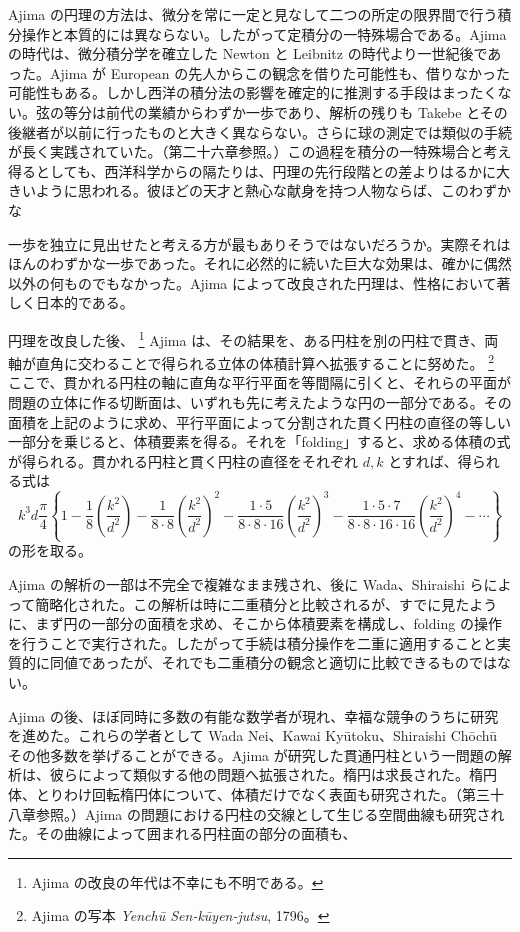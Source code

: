 \documentclass[11pt]{article}
\newcommand{\scanpage}[2]{\clearpage\setcounter{footnote}{0}\noindent{\footnotesize\color{gray}PDF #1 頁 · #2}\par\medskip}
\newcommand{\scanfooter}{}
\begin{document}
Ajima の円理の方法は、微分を常に一定と見なして二つの所定の限界間で行う積分操作と本質的には異ならない。したがって定積分の一特殊場合である。Ajima の時代は、微分積分学を確立した Newton と Leibnitz の時代より一世紀後であった。Ajima が European の先人からこの観念を借りた可能性も、借りなかった可能性もある。しかし西洋の積分法の影響を確定的に推測する手段はまったくない。弦の等分は前代の業績からわずか一歩であり、解析の残りも Takebe とその後継者が以前に行ったものと大きく異ならない。さらに球の測定では類似の手続が長く実践されていた。（第二十六章参照。）この過程を積分の一特殊場合と考え得るとしても、西洋科学からの隔たりは、円理の先行段階との差よりはるかに大きいように思われる。彼ほどの天才と熱心な献身を持つ人物ならば、このわずかな
\scanfooter

\scanpage{0186}{第22章、印刷頁172}
一歩を独立に見出せたと考える方が最もありそうではないだろうか。実際それはほんのわずかな一歩であった。それに必然的に続いた巨大な効果は、確かに偶然以外の何ものでもなかった。Ajima によって改良された円理は、性格において著しく日本的である。

円理を改良した後、
\footnote{Ajima の改良の年代は不幸にも不明である。}
Ajima は、その結果を、ある円柱を別の円柱で貫き、両軸が直角に交わることで得られる立体の体積計算へ拡張することに努めた。
\footnote{Ajima の写本 \emph{Yenchū Sen-kūyen-jutsu}, 1796。}
ここで、貫かれる円柱の軸に直角な平行平面を等間隔に引くと、それらの平面が問題の立体に作る切断面は、いずれも先に考えたような円の一部分である。その面積を上記のように求め、平行平面によって分割された貫く円柱の直径の等しい一部分を乗じると、体積要素を得る。それを「folding」すると、求める体積の式が得られる。貫かれる円柱と貫く円柱の直径をそれぞれ $d,k$ とすれば、得られる式は
\[
k^3d\frac{\pi}{4}\left\{1-\frac18\left(\frac{k^2}{d^2}\right)
-\frac1{8\cdot8}\left(\frac{k^2}{d^2}\right)^2
-\frac{1\cdot5}{8\cdot8\cdot16}\left(\frac{k^2}{d^2}\right)^3
-\frac{1\cdot5\cdot7}{8\cdot8\cdot16\cdot16}\left(\frac{k^2}{d^2}\right)^4-\cdots\right\}
\]
の形を取る。

Ajima の解析の一部は不完全で複雑なまま残され、後に Wada、Shiraishi らによって簡略化された。この解析は時に二重積分と比較されるが、すでに見たように、まず円の一部分の面積を求め、そこから体積要素を構成し、folding の操作を行うことで実行された。したがって手続は積分操作を二重に適用することと実質的に同値であったが、それでも二重積分の観念と適切に比較できるものではない。

Ajima の後、ほぼ同時に多数の有能な数学者が現れ、幸福な競争のうちに研究を進めた。これらの学者として Wada Nei、Kawai Kyūtoku、Shiraishi Chōchū その他多数を挙げることができる。Ajima が研究した貫通円柱という一問題の解析は、彼らによって類似する他の問題へ拡張された。楕円は求長された。楕円体、とりわけ回転楕円体について、体積だけでなく表面も研究された。（第三十八章参照。）Ajima の問題における円柱の交線として生じる空間曲線も研究された。その曲線によって囲まれる円柱面の部分の面積も、
\scanfooter
\end{document}
